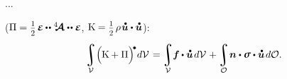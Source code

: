 


...





(${\potentialenergydensity = \smash{\smalldisplaystyleonehalf} \hspace{.25ex} \infinitesimaldeformation \hspace{-0.1ex} \dotdotp \stiffnesstensor \dotdotp \infinitesimaldeformation}$,
${\kineticenergydensity = \smash{\smalldisplaystyleonehalf} \hspace{.25ex} \rho \hspace{.2ex} \mathdotabove{\bm{u}} \dotp \mathdotabove{\bm{u}}}$):

\nopagebreak\vspace{-0.1em}\begin{equation}
\integral\displaylimits_{\mathcal{V}} \hspace{-0.42ex} \left(^{\mathstrut} \hspace{-0.2ex} \kineticenergydensity + \potentialenergydensity \right)^{\hspace{-0.12em}\tikz[baseline=-0.2ex] \draw[black, fill=black] (0,0) circle (.28ex);} \hspace{-0.25ex} d\mathcal{V} \hspace{.2ex}
= \hspace{-0.1ex}
\integral\displaylimits_{\mathcal{V}} \hspace{-0.5ex} \bm{f} \hspace{-0.1ex} \dotp \mathdotabove{\bm{u}} \hspace{.25ex} d\mathcal{V} \hspace{.16ex}
+ \hspace{-0.1ex}
\integral\displaylimits_{\mathcal{O}} \hspace{-0.32ex} \bm{n} \dotp \linearstress \dotp \mathdotabove{\bm{u}} \hspace{.25ex} d\mathcal{O} .
\end{equation}


